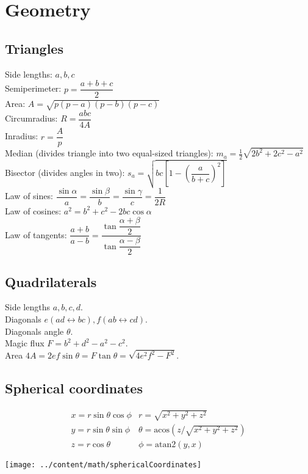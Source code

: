 \section{Geometry}

\subsection{Triangles}
Side lengths: $a,b,c$\\
Semiperimeter: $p=\dfrac{a+b+c}{2}$\\
Area: $A=\sqrt{p(p-a)(p-b)(p-c)}$\\
Circumradius: $R=\dfrac{abc}{4A}$\\
Inradius: $r=\dfrac{A}{p}$\\
Median (divides triangle into two equal-sized triangles): $m_a=\tfrac{1}{2}\sqrt{2b^2+2c^2-a^2}$\\
Bisector (divides angles in two): $s_a=\sqrt{bc\left[1-\left(\dfrac{a}{b+c}\right)^2\right]}$\\
Law of sines: $\dfrac{\sin\alpha}{a}=\dfrac{\sin\beta}{b}=\dfrac{\sin\gamma}{c}=\dfrac{1}{2R}$\\
Law of cosines: $a^2=b^2+c^2-2bc\cos\alpha$\\
Law of tangents: $\dfrac{a+b}{a-b}=\dfrac{\tan\dfrac{\alpha+\beta}{2}}{\tan\dfrac{\alpha-\beta}{2}}$\\

\vspace{2mm} %
\subsection{Quadrilaterals}
Side lengths $a,b,c,d$.\\
Diagonals $e(ad\leftrightarrow bc), f(ab\leftrightarrow cd)$.\\
Diagonals angle $\theta$.\\
Magic flux $F=b^2+d^2-a^2-c^2$.\\
Area $4A=2ef\sin\theta=F\tan\theta=\sqrt{4e^2f^2-F^2}$.\\

\subsection{Spherical coordinates}
\begin{minipage}{75mm}
$$\begin{array}{cc}
x = r\sin\theta\cos\phi & r = \sqrt{x^2+y^2+z^2}\\
y = r\sin\theta\sin\phi & \theta = \textrm{acos}(z/\sqrt{x^2+y^2+z^2})\\
z = r\cos\theta & \phi = \textrm{atan2}(y,x)
\end{array}$$
\end{minipage}
\begin{minipage}{15mm}
\texttt{[image: ../content/math/sphericalCoordinates]}
\end{minipage}


